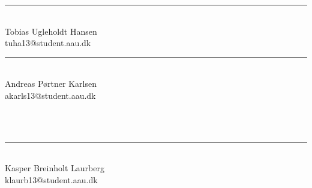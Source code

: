 \newpage
\vspace*{30 mm}
\begin{vplace}

\begin{minipage}[b]{0.45\textwidth}
 \centering
 \rule{\textwidth}{0.5pt}\\
  Tobias Ugleholdt Hansen\\
 {\footnotesize tuha13@student.aau.dk}
\end{minipage}
\begin{minipage}[b]{0.45\textwidth}
 \centering
 \rule{\textwidth}{0.5pt}\\
  Andreas Pørtner Karlsen\\
 {\footnotesize akarls13@student.aau.dk}
\end{minipage}\\\\
\begin{minipage}[b]{0.45\textwidth}
 \centering
 \rule{\textwidth}{0.5pt}\\
  Kasper Breinholt Laurberg\\
 {\footnotesize klaurb13@student.aau.dk}
\end{minipage}\\\\


\end{vplace}
\worksheetend
